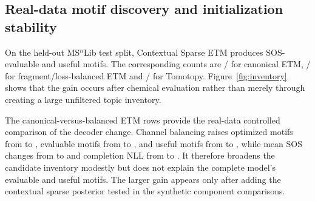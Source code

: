 \documentclass[10pt,a4paper]{article}
\begin{document}
\subsection{Real-data motif discovery and initialization stability}

On the held-out MS$^{n}$Lib test split, Contextual Sparse ETM produces
\ContextualEvaluable{} SOS-evaluable and \ContextualUseful{} useful motifs. The
corresponding counts are \CanonicalEvaluable{}/\CanonicalUseful{} for canonical
ETM, \BalancedEvaluable{}/\BalancedUseful{} for fragment/loss-balanced ETM and
\TomotopyEvaluable{}/\TomotopyUseful{} for Tomotopy. Figure~\ref{fig:inventory}
shows that the gain occurs after chemical evaluation rather than merely through
creating a large unfiltered topic inventory.

The canonical-versus-balanced ETM rows provide the real-data controlled
comparison of the
decoder change. Channel balancing raises optimized motifs from
\CanonicalOptimized{} to \BalancedOptimized{}, evaluable motifs from
\CanonicalEvaluable{} to \BalancedEvaluable{}, and useful motifs from
\CanonicalUseful{} to \BalancedUseful{}, while mean SOS changes from
\CanonicalMeanSOS{} to \BalancedMeanSOS{} and completion NLL from
\CanonicalNLL{} to \BalancedNLL{}. It therefore broadens the candidate inventory
modestly but does not explain the complete model's \ContextualEvaluable{}
evaluable and \ContextualUseful{} useful motifs. The larger gain appears only
after adding the contextual sparse posterior tested in the synthetic component
comparisons.
\end{document}
